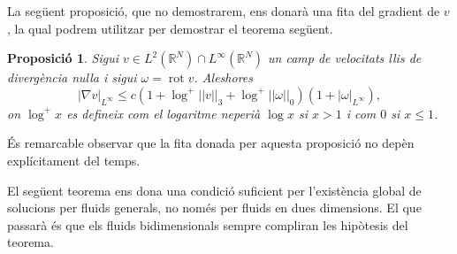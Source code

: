 \documentclass{article}
\numberwithin{equation}{section}
\DeclareMathOperator{\rot}{rot}
\newtheorem{proposicio}{Proposici\'{o}}[section]
\begin{document}
La seg\"{u}ent proposici\'{o}, que no demostrarem, ens donar\`{a} una fita del gradient de $v$, la qual podrem utilitzar per demostrar el teorema seg\"{u}ent.

\begin{proposicio}\label{Pro: limit gradient}
Sigui $v\in L^2(\mathbb{R}^N)\cap L^{\infty}(\mathbb{R}^N)$ un camp de velocitats llis de diverg\`{e}ncia nul\textperiodcentered la i sigui $\omega=\rot v$. Aleshores
\begin{equation}\label{Equ. limit gradient}
|\nabla v|_{L^{\infty}}\leq c(1+\log^+||v||_3+\log^+||\omega||_0)(1+|\omega|_{L^{\infty}}),
\end{equation}
on $\log^+x$ es defineix com el logaritme neperi\`{a} $\log x$ si $x>1$ i com $0$ si $x\leq1$.
\end{proposicio}

\'{E}s remarcable observar que la fita donada per aquesta proposici\'{o} no dep\`{e}n expl\'{i}citament del temps.

El seg\"{u}ent teorema ens dona una condici\'{o} suficient per l'exist\`{e}ncia global de solucions per fluids generals, no nom\'{e}s per fluids en dues dimensions. El que passar\`{a} \'{e}s que els fluids bidimensionals sempre compliran les hip\`{o}tesis del teorema.
\end{document}
